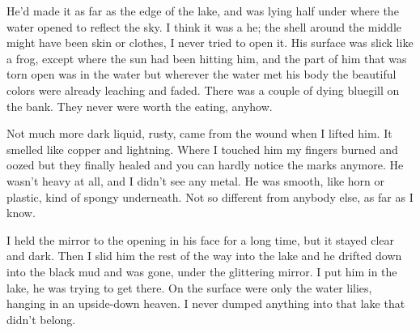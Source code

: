He'd made it as far as the edge of the lake, and was lying half under
where the water opened to reflect the sky. I think it was a he; the
shell around the middle might have been skin or clothes, I never tried
to open it. His surface was slick like a frog, except where the sun had
been hitting him, and the part of him that was torn open was in the
water but wherever the water met his body the beautiful colors were
already leaching and faded. There was a couple of dying bluegill on the
bank. They never were worth the eating, anyhow.

Not much more dark liquid, rusty, came from the wound when I lifted him.
It smelled like copper and lightning. Where I touched him my fingers
burned and oozed but they finally healed and you can hardly notice the
marks anymore. He wasn't heavy at all, and I didn't see any metal. He
was smooth, like horn or plastic, kind of spongy underneath. Not so
different from anybody else, as far as I know.

I held the mirror to the opening in his face for a long time, but it
stayed clear and dark. Then I slid him the rest of the way into the lake
and he drifted down into the black mud and was gone, under the
glittering mirror. I put him in the lake, he was trying to get there. On
the surface were only the water lilies, hanging in an upside-down
heaven. I never dumped anything into that lake that didn't belong.

